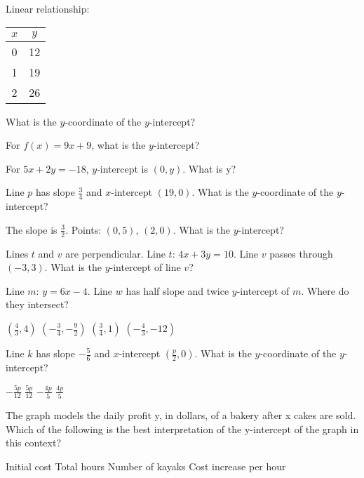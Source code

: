 \documentclass[12pt]{exam}
\begin{document}
\begin{questions}
\question Linear relationship:
\begin{center}
\begin{tabular}{|c|c|}
\hline
$x$ & $y$ \\
\hline
0 & 12 \\
1 & 19 \\
2 & 26 \\
\hline
\end{tabular}
\end{center}
What is the $y$-coordinate of the $y$-intercept?

\question For $f(x) = 9x + 9$, what is the $y$-intercept?

\question For $5x + 2y = -18$, $y$-intercept is $(0,y)$. What is y?

\question Line $p$ has slope $\frac{3}{4}$ and $x$-intercept $(19,0)$. What is the $y$-coordinate of the $y$-intercept?

\question The slope is $\frac{3}{2}$. Points: $(0,5)$, $(2,0)$. What is the $y$-intercept?

\question Lines $t$ and $v$ are perpendicular. Line $t$: $4x + 3y = 10$. Line $v$ passes through $(-3,3)$. What is the $y$-intercept of line $v$?

\question Line $m$: $y = 6x - 4$. Line $w$ has half slope and twice $y$-intercept of $m$. Where do they intersect?
\begin{choices}
\choice $\left( \frac{4}{3}, 4 \right)$
\choice $\left( -\frac{3}{4}, -\frac{9}{2} \right)$
\choice $\left( \frac{3}{4}, 1 \right)$
\choice $\left( -\frac{4}{3}, -12 \right)$
\end{choices}

\question Line $k$ has slope $-\frac{5}{6}$ and $x$-intercept $(\frac{p}{2}, 0)$. What is the $y$-coordinate of the $y$-intercept?
\begin{choices}
\choice $-\frac{5p}{12}$
\choice $\frac{5p}{12}$
\choice $-\frac{4p}{5}$
\choice $\frac{4p}{5}$
\end{choices}

\question The graph models the daily profit y, in dollars, of a bakery after x cakes are sold. Which of the following is the best interpretation of the y-intercept of the graph in this context?
\begin{choices}
\choice Initial cost
\choice Total hours
\choice Number of kayaks
\choice Cost increase per hour
\end{choices}
\begin{center}
\end{center}


\end{questions}
\end{document}
